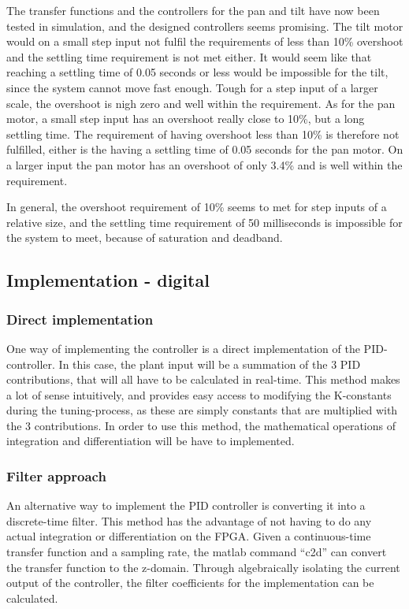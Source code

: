 The transfer functions and the controllers for the pan and tilt have now been tested in simulation, and the designed controllers seems promising. The tilt motor would on a small step input not fulfil the requirements of less than 10\% overshoot and the settling time requirement is not met either. It would seem like that reaching a settling time of 0.05 seconds or less would be impossible for the tilt, since the system cannot move fast enough. Tough for a step input of a larger scale, the overshoot is nigh zero and well within the requirement.
As for the pan motor, a small step input has an overshoot really close to 10\%, but a long settling time. The requirement of having overshoot less than 10\% is therefore not fulfilled, either is the having a settling time of 0.05 seconds for the pan motor. On a larger input the pan motor has an overshoot of only 3.4\% and is well within the requirement.

In general, the overshoot requirement of 10\% seems to met for step inputs of a relative size, and the settling time requirement of 50 milliseconds is impossible for the system to meet, because of saturation and deadband.

\subsection{Implementation - digital}

\subsubsection{Direct implementation}

One way of implementing the controller is a direct implementation of the PID-controller. In this case, the plant input will be a summation of the 3 PID contributions, that will all have to be calculated in real-time. This method makes a lot of sense intuitively, and provides easy access to modifying the K-constants during the tuning-process, as these are simply constants that are multiplied with the 3 contributions. In order to use this method, the mathematical operations of integration and differentiation will be have to implemented.


\subsubsection{Filter approach}

An alternative way to implement the PID controller is converting it into a discrete-time filter. This method has the advantage of not having to do any actual integration or differentiation on the FPGA. Given a continuous-time transfer function and a sampling rate, the matlab command “c2d” can convert the transfer function to the z-domain. Through algebraically isolating the current output of the controller, the filter coefficients for the implementation can be calculated.\par

